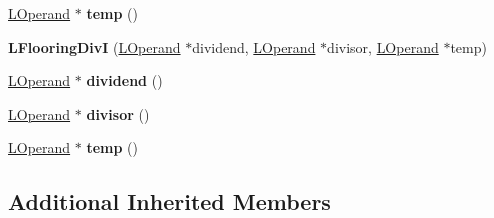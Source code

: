 \begin{DoxyCompactItemize}
\item 
\hyperlink{classv8_1_1internal_1_1_l_operand}{L\+Operand} $\ast$ {\bfseries temp} ()\hypertarget{classv8_1_1internal_1_1_l_flooring_div_i_a2bf7b47423b702a7916cf167bcbd322d}{}\label{classv8_1_1internal_1_1_l_flooring_div_i_a2bf7b47423b702a7916cf167bcbd322d}

\item 
{\bfseries L\+Flooring\+DivI} (\hyperlink{classv8_1_1internal_1_1_l_operand}{L\+Operand} $\ast$dividend, \hyperlink{classv8_1_1internal_1_1_l_operand}{L\+Operand} $\ast$divisor, \hyperlink{classv8_1_1internal_1_1_l_operand}{L\+Operand} $\ast$temp)\hypertarget{classv8_1_1internal_1_1_l_flooring_div_i_ac86b4e7af079084e1bf5758a9c9ecef1}{}\label{classv8_1_1internal_1_1_l_flooring_div_i_ac86b4e7af079084e1bf5758a9c9ecef1}

\item 
\hyperlink{classv8_1_1internal_1_1_l_operand}{L\+Operand} $\ast$ {\bfseries dividend} ()\hypertarget{classv8_1_1internal_1_1_l_flooring_div_i_aa8325f9821019c14c21d3db92a6e27bb}{}\label{classv8_1_1internal_1_1_l_flooring_div_i_aa8325f9821019c14c21d3db92a6e27bb}

\item 
\hyperlink{classv8_1_1internal_1_1_l_operand}{L\+Operand} $\ast$ {\bfseries divisor} ()\hypertarget{classv8_1_1internal_1_1_l_flooring_div_i_a08339949c5e8e7eeaaa718262a80085f}{}\label{classv8_1_1internal_1_1_l_flooring_div_i_a08339949c5e8e7eeaaa718262a80085f}

\item 
\hyperlink{classv8_1_1internal_1_1_l_operand}{L\+Operand} $\ast$ {\bfseries temp} ()\hypertarget{classv8_1_1internal_1_1_l_flooring_div_i_a2bf7b47423b702a7916cf167bcbd322d}{}\label{classv8_1_1internal_1_1_l_flooring_div_i_a2bf7b47423b702a7916cf167bcbd322d}

\end{DoxyCompactItemize}
\subsection*{Additional Inherited Members}



